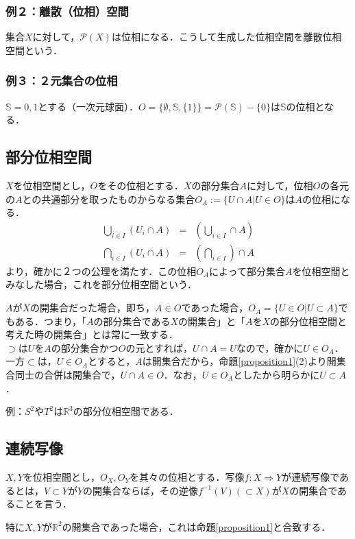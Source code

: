 \documentclass[uplatex, 12pt, a4paper, dvipdfmx]{jsarticle}
\begin{document}
\subsubsection{例２：離散（位相）空間}
集合$X$に対して，$\mathcal{P}(X)$は位相になる．こうして生成した位相空間を離散位相空間という．

\subsubsection{例３：２元集合の位相}
$\mathbb{S}={0,1}$とする（一次元球面）．$O=\{\emptyset, \mathbb{S}, \{1\}\} = \mathcal{P}(\mathbb{S})-\{ 0 \}$は$\mathbb{S}$の位相となる．

\subsection{部分位相空間}
$X$を位相空間とし，$O$をその位相とする．$X$の部分集合$A$に対して，位相$O$の各元の$A$との共通部分を取ったものからなる集合$O_A:=\{ U\cap A | U\in O \}$は$A$の位相になる．
\begin{eqnarray*}
    \bigcup_{i\in I}(U_i\cap A) &=& (\bigcup_{i\in I} \cap A) \\
    \bigcap_{i\in I}(U_i\cap A) &=& (\bigcap_{i\in I}) \cap A 
\end{eqnarray*}
より，確かに２つの公理を満たす．この位相$O_A$によって部分集合$A$を位相空間とみなした場合，これを部分位相空間という．\par

$A$が$X$の開集合だった場合，即ち，$A\in O$であった場合，$O_A=\{U\in O | U\subset A \}$でもある．つまり，「$A$の部分集合である$X$の開集合」と「$A$を$X$の部分位相空間と考えた時の開集合」とは常に一致する．\\
$\supset$は$U$を$A$の部分集合かつ$O$の元とすれば，$U\cap A=U$なので，確かに$U\in O_A$．一方$\subset$は，$U\in O_A$とすると，$A$は開集合だから，命題\ref{proposition1}(2)より開集合同士の合併は開集合で，$U\cap A \in O$．なお，$U\in O_A$としたから明らかに$U\subset A$．

例：$S^2やT^2$は$\mathbb{R}^3$の部分位相空間である．\\

\subsection{連続写像}

\begin{shadebox}\begin{definition}[連続写像]
    $X,Y$を位相空間とし，$O_X,O_Y$を其々の位相とする．写像$f:X\Longrightarrow Y$が連続写像であるとは，$V\subset Y$が$Y$の開集合ならば，その逆像$f^{-1}(V)(\subset X)$が$X$の開集合であることを言う．
\end{definition}\end{shadebox}
特に$X,Y$が$\mathbb{R}^2$の開集合であった場合，これは命題\ref{proposition1}と合致する．
\end{document}
